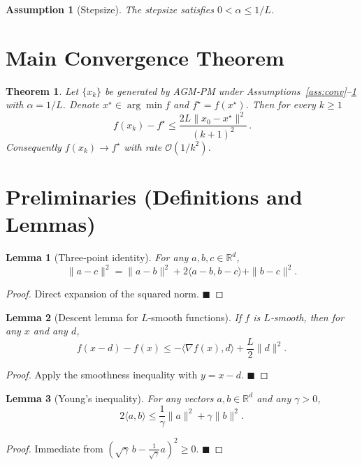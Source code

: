 \documentclass{article}
\newtheorem{theorem}{Theorem}
\newtheorem{lemma}{Lemma}
\newtheorem{assumption}{Assumption}
\begin{document}
\begin{assumption}[Stepsize]\label{ass:step}
The stepsize satisfies $0<\alpha\le 1/L$.
\end{assumption}

\section*{Main Convergence Theorem}
\begin{theorem}\label{thm:rate}
Let $\{x_{k}\}$ be generated by AGM‑PM under Assumptions~\ref{ass:conv}–\ref{ass:step} with $\alpha=1/L$.
Denote $x^{\star}\in\arg\min f$ and $f^{\star}=f(x^{\star})$.
Then for every $k\ge 1$
\[
\boxed{\,f(x_{k})-f^{\star}\le \frac{2L\|x_{0}-x^{\star}\|^{2}}{(k+1)^{2}}\, } .
\]
Consequently $f(x_{k})\to f^{\star}$ with rate $\mathcal{O}(1/k^{2})$.
\end{theorem}

\section*{Preliminaries (Definitions and Lemmas)}
\begin{lemma}[Three‑point identity]\label{lem:3pt}
For any $a,b,c\in\mathbb{R}^{d}$,
\[
\|a-c\|^{2}= \|a-b\|^{2}+2\langle a-b,b-c\rangle+\|b-c\|^{2}.
\]
\end{lemma}
\begin{proof}
Direct expansion of the squared norm. \hfill $\blacksquare$
\end{proof}

\begin{lemma}[Descent lemma for $L$‑smooth functions]\label{lem:descent}
If $f$ is $L$‑smooth, then for any $x$ and any $d$,
\[
f(x-d)-f(x)\le -\langle\nabla f(x),d\rangle+\frac{L}{2}\|d\|^{2}.
\]
\end{lemma}
\begin{proof}
Apply the smoothness inequality with $y=x-d$. \hfill $\blacksquare$
\end{proof}

\begin{lemma}[Young’s inequality]\label{lem:young}
For any vectors $a,b\in\mathbb{R}^{d}$ and any $\gamma>0$,
\[
2\langle a,b\rangle\le \frac{1}{\gamma}\|a\|^{2}+\gamma\|b\|^{2}.
\]
\end{lemma}
\begin{proof}
Immediate from $(\sqrt{\gamma}\,b-\frac{1}{\sqrt{\gamma}}a)^{2}\ge0$. \hfill $\blacksquare$
\end{proof}
\end{document}
